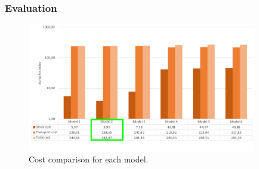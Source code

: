 \documentclass[t,compress,11pt,xcolor=dvipsnames,pdf,english]{beamer}
\begin{document}
\begin{frame}[c]{ }
    \frametitle{Evaluation}
        \begin{figure}[H]
            \includegraphics[width=10cm]{img/costcomparisionMODEL.png}
            \centering
            \caption{Cost comparison for each model.}
        \end{figure}
    \end{frame}






\end{document}
